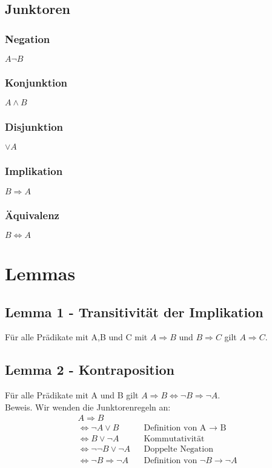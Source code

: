 \documentclass[a4paper,10pt]{article}
\begin{document}
\subsection{Junktoren}
\subsubsection{Negation}
\(A \neg B \)
\subsubsection{Konjunktion}
\(A \wedge B\)
\subsubsection{Disjunktion}
\( \vee A\)
\subsubsection{Implikation}
\(B \Rightarrow A\)
\subsubsection{Äquivalenz}
\(B \Leftrightarrow A\)


\section{Lemmas}
\subsection{Lemma 1 - Transitivität der Implikation}
Für alle Prädikate mit A,B und C mit \(A \Rightarrow B\) und \(B \Rightarrow C\) gilt \(A \Rightarrow C\).
\subsection{Lemma 2 - Kontraposition}
Für alle Prädikate mit A und B gilt \(A \Rightarrow B \Leftrightarrow \neg B \Rightarrow \neg A\).\\
Beweis. Wir wenden die Junktorenregeln an:\\
\begin{align*}
    A \Rightarrow B \\
    \Leftrightarrow \neg A \vee B && \text{Definition von A $\rightarrow$ B}\\
    \Leftrightarrow B \vee \neg A && \text{Kommutativität}\\
    \Leftrightarrow \neg\neg B \vee \neg A && \text{Doppelte Negation}\\
    \Leftrightarrow \neg B \Rightarrow \neg A && \text{Definition von $\neg B \rightarrow \neg A$}\\
\end{align*}
\end{document}
